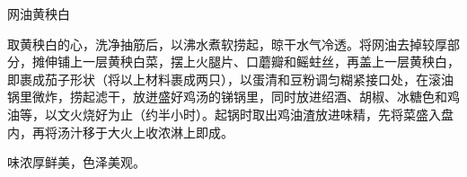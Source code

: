 \begin{recipe}{网油黄秧白}

\ingredients






\cooking

取黄秧白的心，洗净抽筋后，以沸水煮软捞起，晾干水气冷透。将网油去掉较厚部分，摊伸铺上一层黄秧白菜，摆上火腿片、口蘑瓣和鳐蛀丝，再盖上一层黄秧白，即裹成茄子形状（将以上材料裹成两只），以蛋清和豆粉调匀糊紧接口处，在滚油锅里微炸，捞起滤干，放迸盛好鸡汤的锑锅里，同时放进绍酒、胡椒、冰糖色和鸡油等，以文火烧好为止（约半小时）。起锅时取出鸡油渣放进味精，先将菜盛入盘内，再将汤汁移于大火上收浓淋上即成。

\notes

味浓厚鲜美，色泽美观。

\end{recipe}

